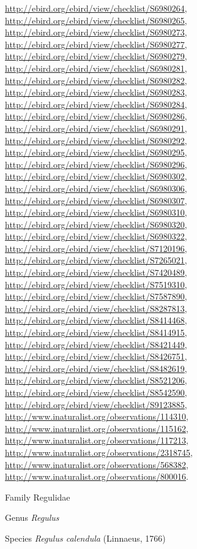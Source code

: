 \documentclass[9pt, article]{memoir}
\begin{document}
\begin{multicols}{2}
\url{http://ebird.org/ebird/view/checklist/S6980264}, 
\url{http://ebird.org/ebird/view/checklist/S6980265}, 
\url{http://ebird.org/ebird/view/checklist/S6980273}, 
\url{http://ebird.org/ebird/view/checklist/S6980277}, 
\url{http://ebird.org/ebird/view/checklist/S6980279}, 
\url{http://ebird.org/ebird/view/checklist/S6980281}, 
\url{http://ebird.org/ebird/view/checklist/S6980282}, 
\url{http://ebird.org/ebird/view/checklist/S6980283}, 
\url{http://ebird.org/ebird/view/checklist/S6980284}, 
\url{http://ebird.org/ebird/view/checklist/S6980286}, 
\url{http://ebird.org/ebird/view/checklist/S6980291}, 
\url{http://ebird.org/ebird/view/checklist/S6980292}, 
\url{http://ebird.org/ebird/view/checklist/S6980295}, 
\url{http://ebird.org/ebird/view/checklist/S6980296}, 
\url{http://ebird.org/ebird/view/checklist/S6980302}, 
\url{http://ebird.org/ebird/view/checklist/S6980306}, 
\url{http://ebird.org/ebird/view/checklist/S6980307}, 
\url{http://ebird.org/ebird/view/checklist/S6980310}, 
\url{http://ebird.org/ebird/view/checklist/S6980320}, 
\url{http://ebird.org/ebird/view/checklist/S6980322}, 
\url{http://ebird.org/ebird/view/checklist/S7120196}, 
\url{http://ebird.org/ebird/view/checklist/S7265021}, 
\url{http://ebird.org/ebird/view/checklist/S7420489}, 
\url{http://ebird.org/ebird/view/checklist/S7519310}, 
\url{http://ebird.org/ebird/view/checklist/S7587890}, 
\url{http://ebird.org/ebird/view/checklist/S8287813}, 
\url{http://ebird.org/ebird/view/checklist/S8414468}, 
\url{http://ebird.org/ebird/view/checklist/S8414915}, 
\url{http://ebird.org/ebird/view/checklist/S8421449}, 
\url{http://ebird.org/ebird/view/checklist/S8426751}, 
\url{http://ebird.org/ebird/view/checklist/S8482619}, 
\url{http://ebird.org/ebird/view/checklist/S8521206}, 
\url{http://ebird.org/ebird/view/checklist/S8542590}, 
\url{http://ebird.org/ebird/view/checklist/S9123885}, 
\url{http://www.inaturalist.org/observations/114310}, 
\url{http://www.inaturalist.org/observations/115162}, 
\url{http://www.inaturalist.org/observations/117213}, 
\url{http://www.inaturalist.org/observations/2318745}, 
\url{http://www.inaturalist.org/observations/568382}, 
\url{http://www.inaturalist.org/observations/800016}.

\vspace{6pt}\noindent\hspace{24pt}Family Regulidae


\vspace{6pt}\noindent\hspace{30pt}Genus \textit{Regulus}


\vspace{6pt}\noindent\hspace{36pt}Species \textit{Regulus calendula} (Linnaeus, 1766)



\end{multicols}
\end{document}
